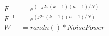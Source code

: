 \begin{equation*}
  \begin{aligned}
	F&=e^{(-j 2\pi (k-1)(n-1)/N)}\\
	F^{-1}&=e^{(j 2\pi (k-1)(n-1)/N)}\\
	W &= randn()*NoisePower
  \end{aligned}
\end{equation*}
